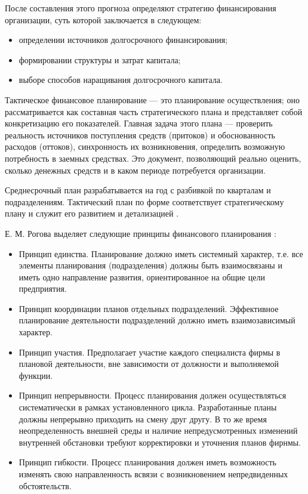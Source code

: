 После составления этого прогноза определяют стратегию финансирования организации, суть которой заключается в следующем:
\begin{itemize}
	\item определении источников долгосрочного финансирования;
	\item формировании структуры и затрат капитала;
	\item выборе способов наращивания долгосрочного капитала.
\end{itemize}

Тактическое финансовое планирование --- это планирование осуществления; оно рассматривается как составная часть стратегического плана и представляет собой конкретизацию его показателей.
Главная задача этого плана --- проверить реальность источников поступления средств (притоков) и обоснованность расходов (оттоков), синхронность их возникновения, определить возможную потребность в заемных средствах.
Это документ, позволяющий реально оценить, сколько денежных средств и в каком периоде потребуется организации.

Среднесрочный план разрабатывается на год с разбивкой по кварталам и подразделениям.
Тактический план по форме соответствует стратегическому плану и служит его развитием и детализацией \cite[179]{kirichenko}.

Е. М. Рогова выделяет следующие принципы финансового планирования \cite[70--72]{rogova}:
\begin{itemize}
	\item Принцип единства.
	Планирование должно иметь системный характер, т.е. все элементы планирования (подразделения) должны быть взаимосвязаны и иметь одно направление развития, ориентированное на общие цели предприятия.
	\item Принцип координации планов отдельных подразделений.
	Эффективное планирование деятельности подразделений должно иметь взаимозависимый характер.
	\item Принцип участия.
	Предполагает участие каждого специалиста фирмы в плановой деятельности, вне зависимости от должности и выполняемой функции.
	\item Принцип непрерывности.
	Процесс планирования должен осуществляться систематически в рамках установленного цикла.
	Разработанные планы должны непрерывно приходить на смену друг другу.
	В то же время неопределенность внешней среды и наличие непредусмотренных изменений внутренней обстановки требуют корректировки и уточнения планов фирнмы.
	\item Принцип гибкости.
	Процесс планирования должен иметь возможность изменять свою направленность всвязи с возникновением непредвиденных обстоятельств.
	
\end{itemize}















